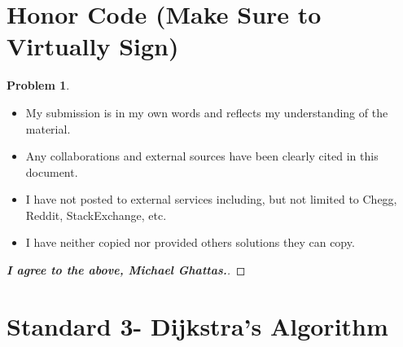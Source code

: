\documentclass[11pt]{article}
\theoremstyle{definition}
\theoremstyle{definition}
\newtheorem{required}{Problem}
\theoremstyle{definition}
\begin{document}
\section{Honor Code (Make Sure to Virtually Sign)} \label{HonorCode}

\begin{required}
\begin{itemize}
\item My submission is in my own words and reflects my understanding of the material.
\item Any collaborations and external sources have been clearly cited in this document.
\item I have not posted to external services including, but not limited to Chegg, Reddit, StackExchange, etc.
\item I have neither copied nor provided others solutions they can copy.
\end{itemize}

\end{required}

\begin{proof}[\textbf{I agree to the above, Michael Ghattas.}]
\end{proof}



\newpage
\section{Standard 3- Dijkstra's Algorithm}
\end{document}
